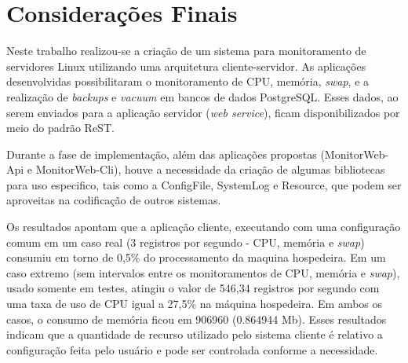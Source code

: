 
\chapter{Considerações Finais} \label{cap:conclusao}

Neste trabalho realizou-se a criação de um sistema para monitoramento de servidores Linux utilizando uma arquitetura cliente-servidor. As aplicações desenvolvidas possibilitaram o monitoramento de CPU, memória, \textit{swap}, e a realização de \textit{backups} e \textit{vacuum} em bancos de dados PostgreSQL. Esses dados, ao serem enviados para a aplicação servidor (\textit{web service}), ficam disponibilizados por meio do padrão ReST.

Durante a fase de implementação, além das aplicações propostas (MonitorWeb-Api e MonitorWeb-Cli), houve a necessidade da criação de algumas bibliotecas para uso especifico, tais como a ConfigFile, SystemLog e Resource, que podem ser aproveitas na codificação de outros sistemas.

Os resultados apontam que a aplicação cliente, executando com uma configuração comum em um caso real (3 registros por segundo - CPU, memória e \textit{swap}) consumiu em torno de 0,5\% do processamento da maquina hospedeira. Em um caso extremo (sem intervalos entre os monitoramentos de CPU, memória e \textit{swap}), usado somente em testes, atingiu o valor de 546,34 registros por segundo com uma taxa de uso de CPU igual a 27,5\% na máquina hospedeira. Em ambos os casos, o consumo de memória ficou em 906960 (0.864944 Mb). Esses resultados indicam que a quantidade de recurso utilizado pelo sistema cliente é relativo a configuração feita pelo usuário e pode ser controlada conforme a necessidade.

